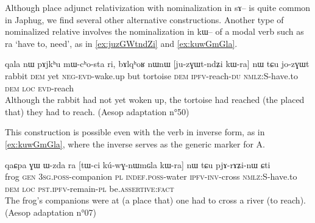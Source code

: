 \documentclass[oldfontcommands,oneside,a4paper,11pt]{article}
\newcommand{\ipa}[1]{{\phon #1}} %
\newcommand{\topic}{\textsc{dem}}
\begin{document}
Although place adjunct relativization with nominalization in \ipa{sɤ}-- is quite common in Japhug, we find several other alternative constructions. Another type of nominalized relative involves the nominalization in \ipa{kɯ}-- of a modal verb such as \ipa{ra} `have to, need', as in  \ref{ex:juzGWtndZi} and \ref{ex:kuwGmGla}.

\begin{exe}
   \ex \label{ex:juzGWtndZi}
 \gll
\ipa{qala}   	\ipa{nɯ}   	\ipa{pɤjkʰu}   	\ipa{mɯ-cʰo-sta}   	\ipa{ri,}   	\ipa{bɤlqʰoʁ}   	\ipa{nɯnɯ}   	[\ipa{ju-zɣɯt-ndʑi}   	\ipa{kɯ-ra}]   	\ipa{nɯ} \ipa{tɕu}   	\ipa{jo-zɣɯt}   \\
rabbit \topic{} yet \textsc{neg-evd}-wake.up but tortoise \topic{} \textsc{ipfv}-reach-\textsc{du} \textsc{nmlz:S}-have.to \topic{} \textsc{loc} \textsc{evd}-reach \\
\glt Although the rabbit had not yet woken up, the tortoise had reached (the placed that) they had to reach.
(Aesop adaptation n°50)
\end{exe}

This construction is possible even with the verb in inverse form, as in \ref{ex:kuwGmGla}, where the inverse serves as the generic marker for A.
\begin{exe}
   \ex \label{ex:kuwGmGla}
 \gll
\ipa{qaɕpa}   	\ipa{ɣɯ}   	\ipa{ɯ-zda}   	\ipa{ra}   	[\ipa{tɯ-ci}   	\ipa{kú-wɣ-nɯmɢla}   	\ipa{kɯ-ra}]   	\ipa{nɯ} \ipa{tɕu}   	\ipa{pjɤ-rɤʑi-nɯ}   	\ipa{ɕti}   \\
frog \textsc{gen}  \textsc{3sg.poss}-companion \textsc{pl} \textsc{indef.poss}-water \textsc{ipfv-inv}-cross \textsc{nmlz:S}-have.to \topic{} \textsc{loc} \textsc{pst.ipfv}-remain-\textsc{pl} be.\textsc{assertive}:\textsc{fact} \\
\glt The frog's companions were at (a place that) one had to cross a river (to reach). (Aesop adaptation n°07)
\end{exe}

\end{document}
